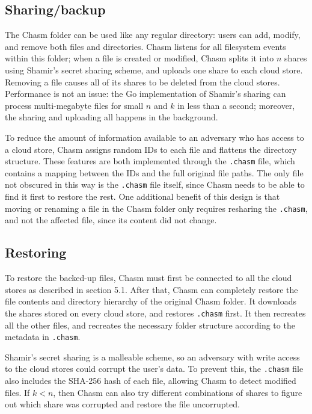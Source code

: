 \documentclass[letterpaper,twocolumn,10pt]{article}
\begin{document}
\subsection{Sharing/backup}
The Chasm folder can be used like any regular directory: users can add, modify, and remove both files and directories. Chasm listens for all filesystem events within this folder; when a file is created or modified, Chasm splits it into $n$ shares using Shamir's secret sharing scheme, and uploads one share to each cloud store. Removing a file causes all of its shares to be deleted from the cloud stores. Performance is not an issue: the Go implementation of Shamir's sharing can process multi-megabyte files for small $n$ and $k$ in less than a second; moreover, the sharing and uploading all happens in the background.

To reduce the amount of information available to an adversary who has access to a cloud store, Chasm assigns random IDs to each file and flattens the directory structure. These features are both implemented through the \texttt{.chasm} file, which contains a mapping between the IDs and the full original file paths. The only file not obscured in this way is the \texttt{.chasm} file itself, since Chasm needs to be able to find it first to restore the rest. One additional benefit of this design is that moving or renaming a file in the Chasm folder only requires resharing the \texttt{.chasm}, and not the affected file, since its content did not change.

\subsection{Restoring}
To restore the backed-up files, Chasm must first be connected to all the cloud stores as described in section 5.1. After that, Chasm can completely restore the file contents and directory hierarchy of the original Chasm folder. It downloads the shares stored on every cloud store, and restores \texttt{.chasm} first. It then recreates all the other files, and recreates the necessary folder structure according to the metadata in \texttt{.chasm}.

Shamir's secret sharing is a malleable scheme, so an adversary with write access to the cloud stores could corrupt the user's data. To prevent this, the \texttt{.chasm} file also includes the SHA-256 hash of each file, allowing Chasm to detect modified files. If $k<n$, then Chasm can also try different combinations of shares to figure out which share was corrupted and restore the file uncorrupted.
\end{document}
